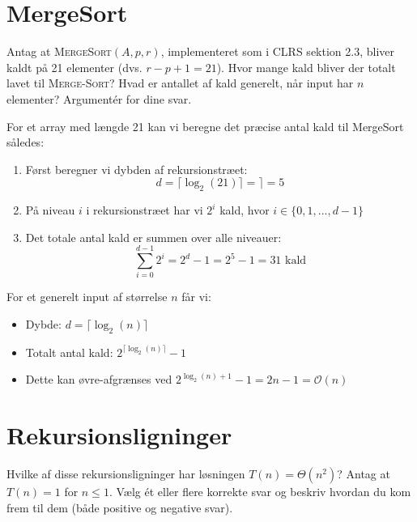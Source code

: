 \documentclass{article}
\theoremstyle{definition}
\begin{document}
\section{MergeSort}
Antag at \textsc{MergeSort}$(A,p,r)$, implementeret som i CLRS sektion 2.3, bliver kaldt på 21 
elementer (dvs. $r-p+1=21$). Hvor mange kald bliver der totalt lavet til \textsc{Merge-Sort}? 
Hvad er antallet af kald generelt, når input har $n$ elementer? Argumentér for dine svar.

For et array med længde 21 kan vi beregne det præcise antal kald til MergeSort således:

\begin{enumerate}
    \item Først beregner vi dybden af rekursionstræet:
        \[ d = \lceil \log_2(21) \rceil =  \rceil = 5 \]
    
    \item På niveau $i$ i rekursionstræet har vi $2^i$ kald, hvor $i \in \{0,1,...,d-1\}$
    
    \item Det totale antal kald er summen over alle niveauer:
        \[ \sum_{i=0}^{d-1} 2^i = 2^d - 1 = 2^5 - 1 = 31 \text{ kald} \]
\end{enumerate}

For et generelt input af størrelse $n$ får vi:
\begin{itemize}
    \item Dybde: $d = \lceil \log_2(n) \rceil$
    \item Totalt antal kald: $2^{\lceil \log_2(n) \rceil} - 1$
    \item Dette kan øvre-afgrænses ved $2^{\log_2(n) + 1} - 1 = 2n - 1 = \mathcal{O}(n)$
\end{itemize}

\section{Rekursionsligninger}
Hvilke af disse rekursionsligninger har løsningen $T(n) = \Theta(n^2)$? Antag at $T(n) = 1$ for 
$n \leq 1$. Vælg ét eller flere korrekte svar og beskriv hvordan du kom frem til dem (både 
positive og negative svar).
\end{document}
